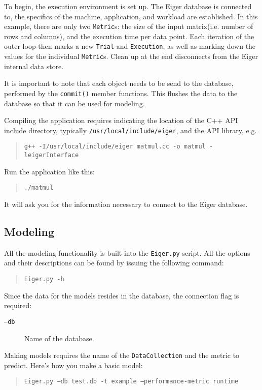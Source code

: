 To begin, the execution environment is set up. The Eiger database is connected to, the specifics of the machine, application, and workload are established. In this example, there are only two \texttt{Metric}s: the size of the input matrix(i.e. number of rows and columns), and the execution time per data point. Each iteration of the outer loop then marks a new \texttt{Trial} and \texttt{Execution}, as well as marking down the values for the individual \texttt{Metric}s. Clean up at the end disconnects from the Eiger internal data store.

It is important to note that each object needs to be send to the database, performed by the \texttt{commit()} member functions. This flushes the data to the database so that it can be used for modeling.

Compiling the application requires indicating the location of the C++ API include directory, typically \texttt{/usr/local/include/eiger}, and the API library, e.g.
	\begin{quote}
	\texttt{g++ -I/usr/local/include/eiger matmul.cc -o matmul -leigerInterface}
	\end{quote}

Run the application like this:
	\begin{quote}
	\texttt{./matmul}
	\end{quote}
It will ask you for the information necessary to connect to the Eiger database.

\subsection{Modeling}
All the modeling functionality is built into the \texttt{Eiger.py} script. All the options and their descriptions can be found by issuing the following command: 
	\begin{quote}
	\texttt{Eiger.py -h}
	\end{quote}

Since the data for the models resides in the database, the connection flag is required:
	\begin{description}
	\item[\texttt{--db}] Name of the database.
	\end{description}
Making models requires the name of the \texttt{DataCollection} and the metric to predict. Here's how you make a basic model:
	\begin{quote}
	\texttt{Eiger.py --db test.db -t example --performance-metric runtime}
	\end{quote}


